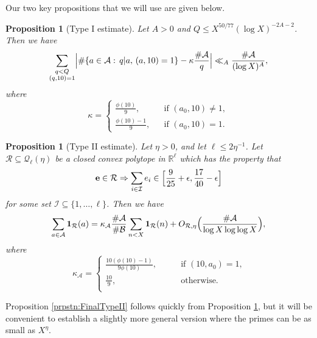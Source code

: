 \documentclass[10pt]{amsart}
\theoremstyle{plain}
\newtheorem{prpstn}[thrm]{Proposition}
\numberwithin{sblmm}{thrm}
\numberwithin{equation}{section}
\begin{document}
Our two key propositions that we will use are given below.
%
%
%
%
\begin{prpstn}[Type I estimate]\label{prpstn:TypeI}
%
Let $A>0$ and $Q\le X^{50/77}(\log{X})^{-2A-2}$.  Then we have
\[
\sum_{\substack{q<Q\\ (q,10)=1}}\Bigl|\#\{a\in\mathcal{A}:\,q|a,\,(a,10)=1\}-\kappa\frac{\#\mathcal{A}}{q}\Bigr|\ll_A \frac{\#\mathcal{A}}{(\log{X})^A},
\]
where
\[
\kappa=\begin{cases}
\frac{\phi(10)}{9},\qquad&\text{if }(a_0,10)\ne1,\\
\frac{\phi(10)-1}{9},&\text{if }(a_0,10)=1.
\end{cases}
\]
%
\end{prpstn}
%
%
%
%
\begin{prpstn}[Type II estimate] \label{prpstn:TypeII}
%
Let $\eta>0$, and let $\ell\le 2\eta^{-1}$. Let $\mathcal{R}\subseteq \mathcal{Q}_\ell(\eta)$ be a closed convex polytope in $\mathbb{R}^\ell$ which has the property that
\[
\mathbf{e}\in\mathcal{R}\Rightarrow \sum_{i\in\mathcal{I}} e_i\in\Bigl[\frac{9}{25}+\epsilon,\frac{17}{40}-\epsilon\Bigr]
\]
for some set $\mathcal{I}\subseteq\{1,\dots,\ell\}$. Then we have
\[
\sum_{\substack{a\in\mathcal{A}}}\mathbf{1}_{\mathcal{R}}(a)=\kappa_\mathcal{A}\frac{\#\mathcal{A}{}}{\#\mathcal{B}{}}\sum_{n<  X}\mathbf{1}_{\mathcal{R}}(n)+O_{\mathcal{R},\eta}\Bigl(\frac{\#\mathcal{A}}{\log{X}\log\log{X}}\Bigr),
\]
where
\[
\kappa_\mathcal{A}=
\begin{cases}
\frac{10(\phi(10)-1)}{9\phi(10)},\qquad&\text{if $(10,a_0)=1$,}\\
\frac{10}{9},&\text{otherwise.}\\
\end{cases}
\]
%
\end{prpstn}
%
%
%
%
Proposition \ref{prpstn:FinalTypeII} follows quickly from Proposition \ref{prpstn:TypeII}, but it will be convenient to establish a slightly more general version where the primes can be as small as $X^\eta$. 
%
%
%
\end{document}
